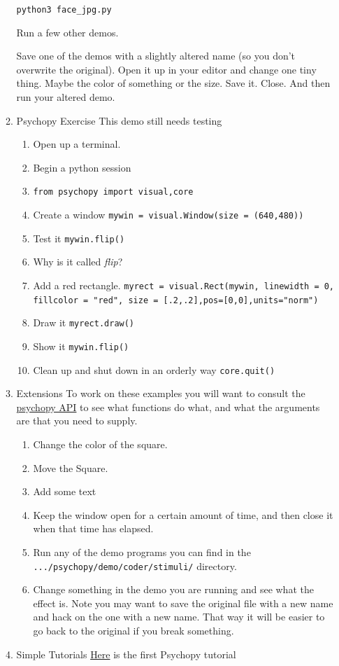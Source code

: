 \documentclass{article}
\begin{document}
\begin{enumerate}
\begin{enumerate}
\texttt{python3 face\_jpg.py}

Run a few other demos.

Save one of the demos with a slightly altered name (so you don't overwrite the original). Open it up in your editor and change one tiny thing. Maybe the color of something or the size. Save it. Close. And then run your altered demo. 
\item Psychopy Exercise
\label{sec:org5a315f9}
This demo still needs testing
\begin{enumerate}
\item Open up a terminal.
\item Begin a python session
\item \texttt{from psychopy import visual,core}
\item Create a window
\texttt{mywin = visual.Window(size = (640,480))}
\item Test it
\texttt{mywin.flip()}
\item Why is it called \emph{flip}?
\item Add a red rectangle.
\texttt{myrect = visual.Rect(mywin, linewidth = 0, fillcolor = "red", size = [.2,.2],pos=[0,0],units="norm")}
\item Draw it
\texttt{myrect.draw()}
\item Show it
\texttt{mywin.flip()}
\item Clean up and shut down in an orderly way
\texttt{core.quit()}
\end{enumerate}
\item Extensions
\label{sec:org5f8c311}
To work on these examples you will want to consult the \href{https://www.psychopy.org/api/api.html}{psychopy API} to see what functions do what, and what the arguments are that you need to supply. 
\begin{enumerate}
\item Change the color of the square.
\item Move the Square.
\item Add some text
\item Keep the window open for a certain amount of time, and then close it when that time has elapsed.
\item Run any of the demo programs you can find in the \texttt{.../psychopy/demo/coder/stimuli/} directory.
\item Change something in the demo you are running and see what the effect is.
Note you may want to save the original file with a new name and hack on the one with a new name. That way it will be easier to go back to the original if you break something.
\end{enumerate}
\item Simple Tutorials
\label{sec:org8ad60b7}
\href{https://www.psychopy.org/coder/tutorial1.html}{Here} is the first Psychopy tutorial 


\end{enumerate}
\end{enumerate}
\end{document}
